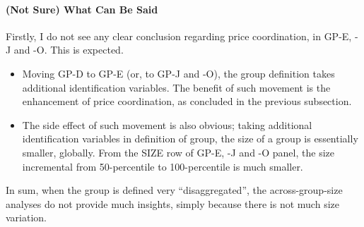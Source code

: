 \paragraph{(Not Sure) What Can Be Said}

Firstly, I do not see any clear conclusion regarding price coordination, in GP-E, -J and -O. This is expected.
\begin{itemize}
	\item Moving GP-D to GP-E (or, to GP-J and -O), the group definition takes additional identification variables. The benefit of such movement is the enhancement of price coordination, as concluded in the previous subsection.
	\item The side effect of such movement is also obvious; taking additional identification variables in definition of group, the size of a group is essentially smaller, globally. From the SIZE row of GP-E, -J and -O panel, the size incremental from 50-percentile to 100-percentile is much smaller.
\end{itemize}
In sum, when the group is defined very ``disaggregated'', the across-group-size analyses do not provide much insights, simply because there is not much size variation.

